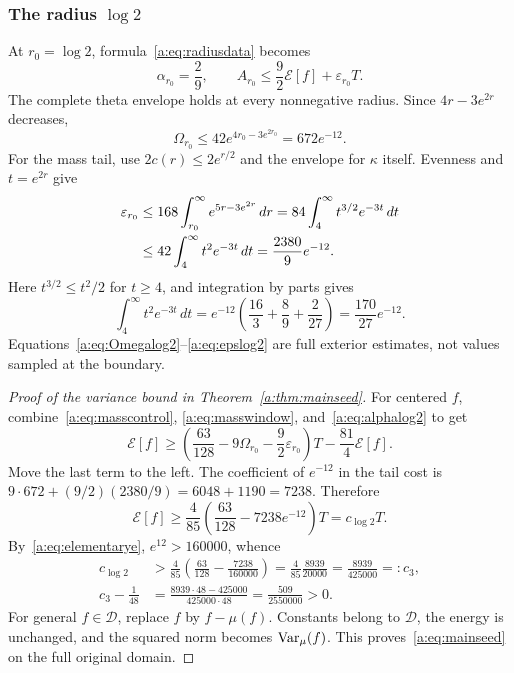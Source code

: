 \documentclass[11pt,a4paper]{article}
\numberwithin{equation}{section}
\theoremstyle{definition}\newtheorem{definition}[theorem]{Definition}
\theoremstyle{remark}\newtheorem{remark}[theorem]{Remark}
\newcommand{\E}{\mathcal E}\newcommand{\D}{\mathcal D}
\begin{document}
\subsubsection{The radius \texorpdfstring{$\log2$}{log 2}}

At $r_0=\log2$, formula~\eqref{a:eq:radiusdata} becomes
\begin{equation}\label{a:eq:alphalog2}
 \alpha_{r_0}=\frac29,\qquad
 A_{r_0}\le\frac92\E[f]+\varepsilon_{r_0}T.
\end{equation}
The complete theta envelope holds at every nonnegative radius. Since $4r-3e^{2r}$ decreases,
\begin{equation}\label{a:eq:Omegalog2}
 \Omega_{r_0}\le42e^{4r_0-3e^{2r_0}}=672e^{-12}.
\end{equation}
For the mass tail, use $2c(r)\le2e^{r/2}$ and the envelope for $\kappa$ itself. Evenness and $t=e^{2r}$ give
\begin{align}
 \varepsilon_{r_0}
 &\le168\int_{r_0}^\infty e^{5r-3e^{2r}}\,dr
 =84\int_4^\infty t^{3/2}e^{-3t}\,dt\notag\\
 &\le42\int_4^\infty t^2e^{-3t}\,dt
 =\frac{2380}{9}e^{-12}.\label{a:eq:epslog2}
\end{align}
Here $t^{3/2}\le t^2/2$ for $t\ge4$, and integration by parts gives
\[
 \int_4^\infty t^2e^{-3t}\,dt
 =e^{-12}\left(\frac{16}{3}+\frac89+\frac2{27}\right)
 =\frac{170}{27}e^{-12}.
\]
Equations~\eqref{a:eq:Omegalog2}--\eqref{a:eq:epslog2} are full exterior estimates, not values sampled at the boundary.

\begin{proof}[Proof of the variance bound in Theorem~\ref{a:thm:mainseed}]
For centered $f$, combine~\eqref{a:eq:masscontrol}, \eqref{a:eq:masswindow}, and~\eqref{a:eq:alphalog2} to get
\[
 \E[f]\ge\left(\frac{63}{128}-9\Omega_{r_0}
                       -\frac92\varepsilon_{r_0}\right)T
                         -\frac{81}{4}\E[f].
\]
Move the last term to the left. The coefficient of $e^{-12}$ in the tail cost is
$9\cdot672+(9/2)(2380/9)=6048+1190=7238$. Therefore
\[
 \E[f]\ge\frac4{85}\left(\frac{63}{128}-7238e^{-12}\right)T
 =c_{\log2}T.
\]
By~\eqref{a:eq:elementarye}, $e^{12}>160000$, whence
\begin{align*}
 c_{\log2}&>\frac4{85}\left(\frac{63}{128}-\frac{7238}{160000}\right)
 =\frac4{85}\frac{8939}{20000}=\frac{8939}{425000}=:c_3,\\
 c_3-\frac1{48}
 &=\frac{8939\cdot48-425000}{425000\cdot48}
 =\frac{509}{2550000}>0.
\end{align*}
For general $f\in\D$, replace $f$ by $f-\mu(f)$. Constants belong to $\D$, the energy is unchanged, and the squared norm becomes $\operatorname{Var}_\mu(f)$. This proves~\eqref{a:eq:mainseed} on the full original domain.
\end{proof}
\end{document}
